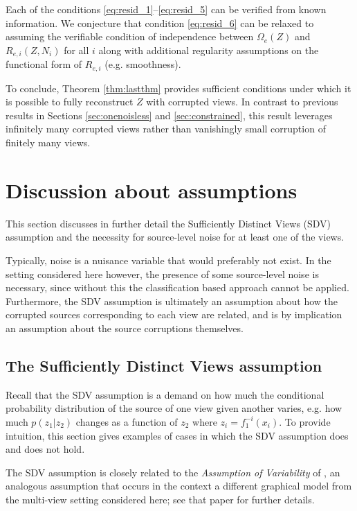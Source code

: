 Each of the conditions \ref{eq:resid_1}--\ref{eq:resid_5} can be verified from known information.
We conjecture that condition \ref{eq:resid_6} can be relaxed to assuming the verifiable condition of independence between $\Omega_{e}(Z)$ and $R_{e, i}(Z, N_i)$ for all $i$ along with additional regularity assumptions on the functional form of $R_{e, i}$ (e.g. smoothness).

To conclude, Theorem \ref{thm:lastthm} provides sufficient conditions under which it is possible to fully reconstruct $Z$ with corrupted views.
In contrast to previous results in Sections \ref{sec:onenoisless} and \ref{sec:constrained}, this result leverages infinitely many corrupted views rather than vanishingly small corruption of finitely many views.




\section{Discussion about assumptions}\label{sec:ica-assumptions}

This section discusses in further detail the Sufficiently Distinct Views (SDV) assumption and the necessity for source-level noise for at least one of the views.

Typically, noise is a nuisance variable that would preferably not exist.
In the setting considered here however, the presence of some source-level noise is necessary, since without this the classification based approach cannot be applied.
Furthermore, the SDV assumption is ultimately an assumption about how the corrupted sources corresponding to each view are related, and is by implication an assumption about the source corruptions themselves.



\subsection{The Sufficiently Distinct Views assumption}
\label{appendix:sdv}

Recall that the SDV assumption is a demand on how much the conditional probability distribution of the source of one view given another varies, e.g. how much $p(z_1 | z_2)$ changes as a function of $z_2$ where $z_i = f_1^{-i}(x_i)$. 
To provide intuition, this section gives examples of cases in which the SDV assumption does and does not hold.

The SDV assumption is closely related to the \emph{Assumption of Variability} of \cite{hyvarinen19a}, an analogous assumption that occurs in the context a different graphical model from the multi-view setting considered here; see that paper for further details.




